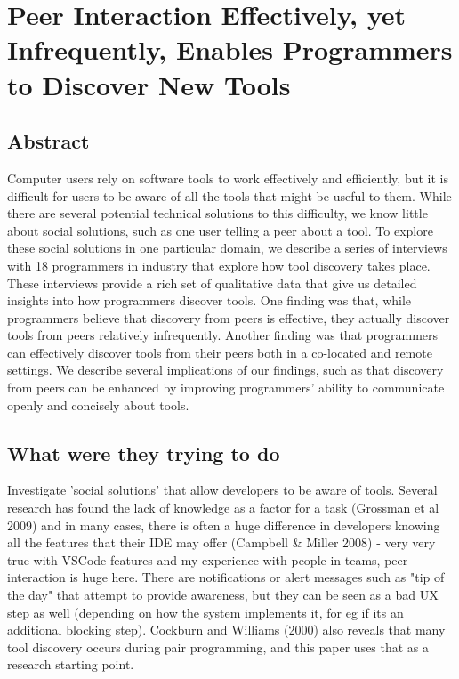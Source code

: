 \section{Peer Interaction Effectively, yet Infrequently, Enables Programmers to Discover New Tools}

\subsection{Abstract}

Computer users rely on software tools to work effectively
and efficiently, but it is difficult for users to be aware of all
the tools that might be useful to them. While there are several potential technical solutions to this difficulty, we know
little about social solutions, such as one user telling a peer
about a tool. To explore these social solutions in one particular domain, we describe a series of interviews with 18 programmers in industry that explore how tool discovery takes
place. These interviews provide a rich set of qualitative data
that give us detailed insights into how programmers discover
tools. One finding was that, while programmers believe that
discovery from peers is effective, they actually discover tools
from peers relatively infrequently. Another finding was that
programmers can effectively discover tools from their peers
both in a co-located and remote settings. We describe several implications of our findings, such as that discovery from
peers can be enhanced by improving programmers’ ability to
communicate openly and concisely about tools.

\subsection{What were they trying to do}

Investigate 'social solutions' that allow developers to be aware of tools. Several research has found the lack of knowledge as a factor for a task (Grossman et al 2009) and in many cases, there is often a huge difference in developers knowing all the features that their IDE may offer (Campbell \& Miller 2008) - very very true with VSCode features and my experience with people in teams, peer interaction is huge here. There are notifications or alert messages such as "tip of the day" that attempt to provide awareness, but they can be seen as a bad UX step as well (depending on how the system implements it, for eg if its an additional blocking step).
Cockburn and Williams (2000) also reveals that many tool discovery occurs during pair programming, and this paper uses that as a research starting point.

